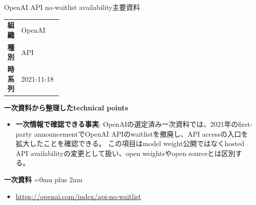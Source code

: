 \begin{technicalnote}{OpenAI API no-waitlist availability}{主要資料}
\begingroup
\begin{tabularx}{\linewidth}{@{}>{\bfseries}p{0.22\linewidth}X@{}}
組織 & OpenAI \\
種別 & API \\
時系列 & 2021-11-18 \\
\end{tabularx}
\smallskip
\begin{minipage}{\linewidth}
{\bfseries 一次資料から整理したtechnical points}
\begin{itemize}[leftmargin=1.5em,itemsep=0.35em]
\item \textbf{一次情報で確認できる事実}: OpenAIの選定済み一次資料では、2021年のfirst-party announcementでOpenAI APIのwaitlistを撤廃し、API accessの入口を拡大したことを確認できる。 この項目はmodel weight公開ではなくhosted API availabilityの変更として扱い、open weightsやopen sourceとは区別する。
\end{itemize}
\begin{minipage}{\linewidth}
\begin{samepage}
{\bfseries 一次資料}
\begingroup\sloppy
\Urlmuskip=0mu plus 2mu\relax
\begin{itemize}[leftmargin=1.5em,itemsep=0.25em]
\item {\scriptsize\url{https://openai.com/index/api-no-waitlist}}
\end{itemize}
\endgroup
\end{samepage}
\end{minipage}
\end{minipage}
\endgroup
\end{technicalnote}
\medskip

